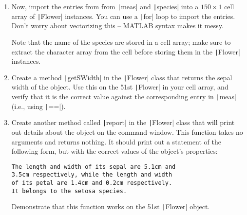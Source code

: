 \documentclass{article}
\begin{document}
\begin{enumerate}
\begin{enumerate}
    \clearpage
  \item Now, import the entries from from \texttt|meas| and \texttt|species| into a $150\times 1$ cell array of \texttt|Flower| instances. You can use a \texttt|for| loop to import the entries. Don't worry about vectorizing this -- MATLAB syntax makes it messy.

    Note that the name of the species are stored in a cell array; make sure to extract the character array from the cell before storing them in the \texttt|Flower| instances.

  \item Create a method \texttt|getSWidth| in the \texttt|Flower| class that returns the sepal width of the object. Use this on the 51st \texttt|Flower| in your cell array, and verify that it is the correct value against the corresponding entry in \texttt|meas| (i.e., using \texttt|==|).

  \item Create another method called \texttt|report| in the \texttt|Flower| class that will print out details about the object on the command window. This function takes no arguments and returns nothing. It should print out a statement of the following form, but with the correct values of the object's properties:
\begin{verbatim}
The length and width of its sepal are 5.1cm and
3.5cm respectively, while the length and width
of its petal are 1.4cm and 0.2cm respectively.
It belongs to the setosa species.
\end{verbatim}
    Demonstrate that this function works on the 51st \texttt|Flower| object.
  \end{enumerate}
\end{enumerate}
\end{document}
